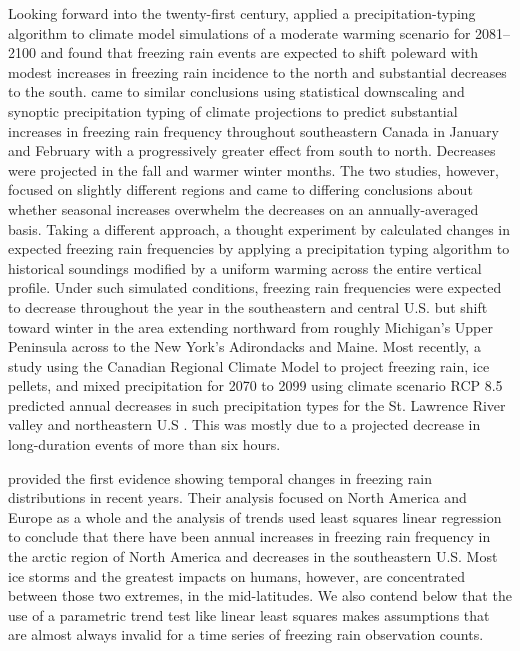 \documentclass[twocol]{ametsoc}
\begin{document}
Looking forward into the twenty-first century, \citet{lambert2011simulated} applied a precipitation-typing algorithm to climate model simulations of a moderate warming scenario for 2081--2100 and found that freezing rain events are expected to shift poleward with modest increases in freezing rain incidence to the north and substantial decreases to the south. \citet{cheng2011possible} came to similar conclusions using statistical downscaling and synoptic precipitation typing of climate projections to predict substantial increases in freezing rain frequency throughout southeastern Canada in January and February with a progressively greater effect from south to north. Decreases were projected in the fall and warmer winter months. The two studies, however, focused on slightly different regions and came to differing conclusions about whether seasonal increases overwhelm the decreases on an annually-averaged basis. Taking a different approach, a thought experiment by \citet{klima2015ice} calculated changes in expected freezing rain frequencies by applying a precipitation typing algorithm to historical soundings modified by a uniform warming across the entire vertical profile. Under such simulated conditions, freezing rain frequencies were expected to decrease throughout the year in the southeastern and central U.S. but shift toward winter in the area extending northward from roughly Michigan's Upper Peninsula across to the New York's Adirondacks and Maine. Most recently, a study using the Canadian Regional Climate Model to project freezing rain, ice pellets, and mixed precipitation for 2070 to 2099 using climate scenario RCP 8.5 predicted annual decreases in such precipitation types for the St. Lawrence River valley and northeastern U.S \citep{matte2018mixed}. This was mostly due to a projected decrease in long-duration events of more than six hours. 

\citet{groisman2016recent} provided the first evidence showing temporal changes in freezing rain distributions in recent years. Their analysis focused on North America and Europe as a whole and the analysis of trends used least squares linear regression to conclude that there have been annual increases in freezing rain frequency in the arctic region of North America and decreases in the southeastern U.S. Most ice storms and the greatest impacts on humans, however, are concentrated between those two extremes, in the mid-latitudes. We also contend below that the use of a parametric trend test like linear least squares makes assumptions that are almost always invalid for a time series of freezing rain observation counts.
\end{document}
